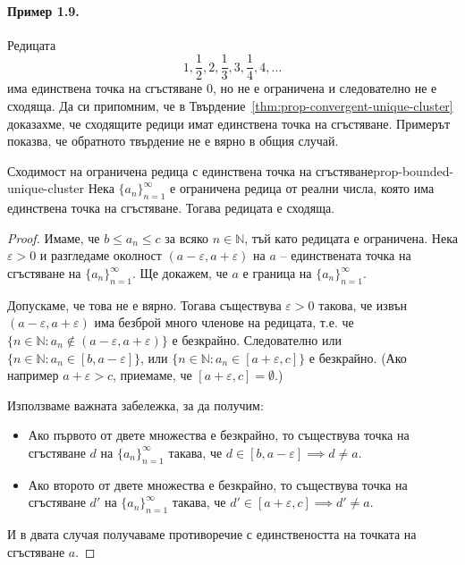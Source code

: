 \paragraph{Пример 1.9.}
Редицата
\[
1, \frac{1}{2}, 2, \frac{1}{3}, 3, \frac{1}{4}, 4, \dots
\]
има единствена точка на сгъстяване $0$, но не е ограничена и следователно не е сходяща. Да си припомним, че в Твърдение~\ref{thm:prop-convergent-unique-cluster} доказахме, че сходящите редици имат единствена точка на сгъстяване. Примерът показва, че обратното твърдение не е вярно в общия случай.

\begin{theorem}{Сходимост на ограничена редица с единствена точка на сгъстяване}{prop-bounded-unique-cluster}
Нека $\{a_n\}_{n=1}^{\infty}$ е ограничена редица от реални числа, която има единствена точка на сгъстяване. Тогава редицата е сходяща.
\end{theorem}

\begin{proof}
Имаме, че $b \le a_n \le c$ за всяко $n \in \mathbb{N}$, тъй като редицата е ограничена. Нека $\varepsilon > 0$ и разгледаме околност $(a - \varepsilon, a + \varepsilon)$ на $a$ -- единствената точка на сгъстяване на $\{a_n\}_{n=1}^{\infty}$. Ще докажем, че $a$ е граница на $\{a_n\}_{n=1}^{\infty}$.

Допускаме, че това не е вярно. Тогава съществува $\varepsilon > 0$ такова, че извън $(a - \varepsilon, a + \varepsilon)$ има безброй много членове на редицата, т.е. че $\{n \in \mathbb{N} : a_n \notin (a - \varepsilon, a + \varepsilon)\}$ е безкрайно. Следователно или $\{n \in \mathbb{N} : a_n \in [b, a - \varepsilon]\}$, или $\{n \in \mathbb{N} : a_n \in [a + \varepsilon, c]\}$ е безкрайно. (Ако например $a + \varepsilon > c$, приемаме, че $[a + \varepsilon, c] = \emptyset$.)

Използваме важната забележка, за да получим:
\begin{itemize}
    \item Ако първото от двете множества е безкрайно, то съществува точка на сгъстяване $d$ на $\{a_n\}_{n=1}^{\infty}$ такава, че $d \in [b, a - \varepsilon] \implies d \ne a$.
    \item Ако второто от двете множества е безкрайно, то съществува точка на сгъстяване $d'$ на $\{a_n\}_{n=1}^{\infty}$ такава, че $d' \in [a + \varepsilon, c] \implies d' \ne a$.
\end{itemize}
И в двата случая получаваме противоречие с единствеността на точката на сгъстяване $a$.
\end{proof}

